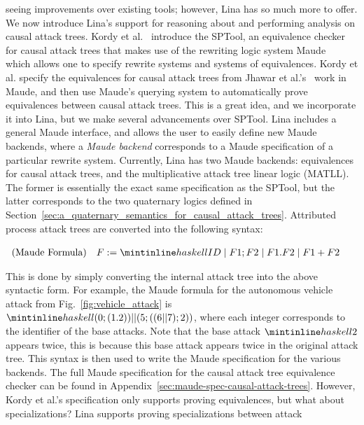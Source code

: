 \documentclass{llncs}
\begin{document}
seeing improvements over existing tools; however, Lina has so much
more to offer.  We now introduce Lina's support for reasoning about
and performing analysis on causal attack trees.
Kordy et al.~\cite{Kordy2017} introduce the SPTool, an equivalence
checker for causal attack trees that makes use of the rewriting logic
system Maude~\cite{clavel2005maude} which allows one to specify
rewrite systems and systems of equivalences.  Kordy et al. specify the
equivalences for causal attack trees from Jhawar et
al.'s~\cite{Jhawar:2015} work in Maude, and then use Maude's querying
system to automatically prove equivalences between causal attack
trees.  This is a great idea, and we incorporate it into Lina, but we
make several advancements over SPTool.
Lina includes a general Maude interface, and allows the user to easily
define new Maude backends, where a \emph{Maude backend} corresponds to
a Maude specification of a particular rewrite system.  Currently, Lina
has two Maude backends: equivalences for causal attack trees, and the
multiplicative attack tree linear logic (MATLL).  The former is
essentially the exact same specification as the SPTool, but the latter
corresponds to the two quaternary logics defined in
Section~\ref{sec:a_quaternary_semantics_for_causal_attack_trees}.
Attributed process attack trees are converted into the following
syntax:
\begin{center}
  \begin{math}
    \begin{array}{lll}
      \text{(Maude Formula)} & F := \mh{ID} \mid F1 ; F2 \mid F1.F2 \mid F1+F2
    \end{array}
  \end{math}
\end{center}
This is done by simply converting the internal attack tree into the
above syntactic form.  For example, the Maude formula for the
autonomous vehicle attack from Fig.~\ref{fig:vehicle_attack} is
$\mh{(0 ; (1 . 2)) || (5 ; ((6 || 7) ; 2))}$, where each integer
corresponds to the identifier of the base attacks.  Note that the base
attack $\mh{2}$ appears twice, this is because this base attack
appears twice in the original attack tree.  This syntax is then used
to write the Maude specification for the various backends.
The full Maude specification for the causal attack tree equivalence
checker can be found in
Appendix~\ref{sec:maude-spec-causal-attack-trees}.  However, Kordy et
al.'s specification only supports proving equivalences, but what about
specializations?  Lina supports proving specializations between attack
\end{document}

